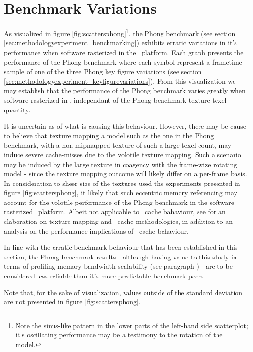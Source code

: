 \section{Benchmark Variations}
\label{sec:analysisexperiment_benchmarkvariations}
As visualized in figure \ref{fig:scattersphong}\footnote{Note the sinus-like pattern in the lower parts of the left-hand side scatterplot; it's oscillating performance may be a testimony to the rotation of the model.}, the Phong benchmark (see section \ref{sec:methodologyexperiment_benchmarking}) exhibits erratic variations in it's performance when software rasterized in the \dvttermsimics\ platform.
Each graph presents the performance of the Phong benchmark where each symbol represent a frametime sample of one of the three Phong key figure variations (see section \ref{sec:methodologyexperiment_keyfigurevariations}).
From this visualization we may establish that the performance of the Phong benchmark varies greatly when software rasterized in \dvttermsimics , independant of the Phong benchmark texture texel quantity.

It is uncertain as of what is causing this behaviour.
However, there may be cause to believe that texture mapping a model such as the one in the Phong benchmark, with a non-mipmapped texture of such a large texel count, may induce severe cache-misses due to the volotile texture mapping.
Such a scenario may be induced by the large texture in coagency with the frame-wize rotating model - since the texture mapping outcome will likely differ on a per-frame basis.
In consideration to sheer size of the textures used the experiments presented in figure \ref{fig:scattersphong}, it likely that such eccentric memory referencing may account for the volotile performance of the Phong benchmark in the software rasterized \dvttermsimics\ platform.
Albeit not applicable to \dvttermcpu\ cache bahaviour, see  for an elaboration on texture mapping and \dvttermgpu\ cache methodologies, in addition to an analysis on the performance implications of \dvttermgpu\ cache behaviour.

In line with the erratic benchmark behaviour that has been established in this section, the Phong benchmark results - although having value to this study in terms of profiling memory bandwidth scalability (see paragraph ) - are to be considered less reliable than it's more predictable benchmark peers.

\noindent
Note that, for the sake of visualization, values outside of the standard deviation are not presented in figure \ref{fig:scattersphong}.

